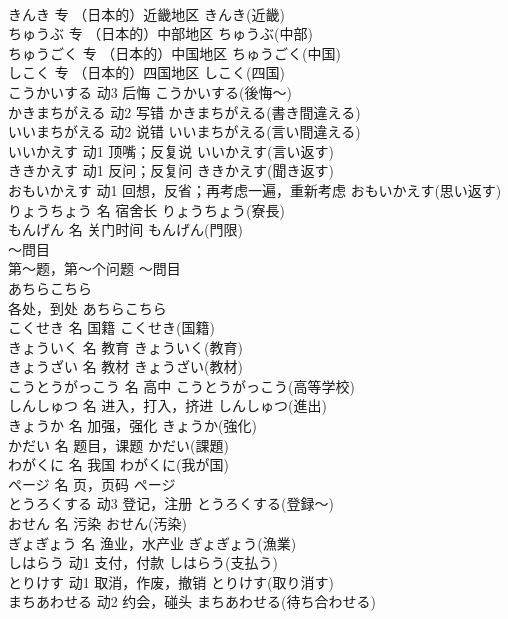 \documentclass[8pt]{extreport}
\begin{document}
\begin{CJK}{UTF8}{min}
\\	きんき	专	（日本的）近畿地区	きんき(近畿)	
\\	ちゅうぶ	专	（日本的）中部地区	ちゅうぶ(中部)	
\\	ちゅうごく	专	（日本的）中国地区	ちゅうごく(中国)	
\\	しこく	专	（日本的）四国地区	しこく(四国)	
\\	こうかいする	动3	后悔	こうかいする(後悔～)	
\\	かきまちがえる	动2	写错	かきまちがえる(書き間違える)	
\\	いいまちがえる	动2	说错	いいまちがえる(言い間違える)	
\\	いいかえす	动1	顶嘴；反复说	いいかえす(言い返す)	
\\	ききかえす	动1	反问；反复问	ききかえす(聞き返す)	
\\	おもいかえす	动1	回想，反省；再考虑一遍，重新考虑	おもいかえす(思い返す)	
\\	りょうちょう	名	宿舍长	りょうちょう(寮長)	
\\	もんげん	名	关门时间	もんげん(門限)	
\\	～問目	
\\	第～题，第～个问题	～問目	
\\	あちらこちら	
\\	各处，到处	あちらこちら	
\\	こくせき	名	国籍	こくせき(国籍)	
\\	きょういく	名	教育	きょういく(教育)	
\\	きょうざい	名	教材	きょうざい(教材)	
\\	こうとうがっこう	名	高中	こうとうがっこう(高等学校)	
\\	しんしゅつ	名	进入，打入，挤进	しんしゅつ(進出)	
\\	きょうか	名	加强，强化	きょうか(強化)	
\\	かだい	名	题目，课题	かだい(課題)	
\\	わがくに	名	我国	わがくに(我が国)	
\\	ページ	名	页，页码	ページ	
\\	とうろくする	动3	登记，注册	とうろくする(登録～)	
\\	おせん	名	污染	おせん(汚染)	
\\	ぎょぎょう	名	渔业，水产业	ぎょぎょう(漁業)	
\\	しはらう	动1	支付，付款	しはらう(支払う)	
\\	とりけす	动1	取消，作废，撤销	とりけす(取り消す)	
\\	まちあわせる	动2	约会，碰头	まちあわせる(待ち合わせる)	

\end{CJK}
\end{document}
